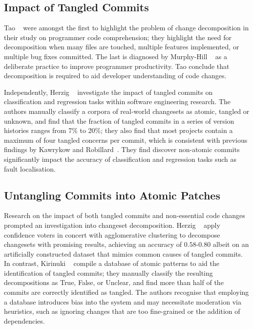 \subsection{Impact of Tangled Commits}
\label{chapter:literature:sec:flexeme_rel_work:impact}

Tao \etal~\cite{Tao2012} were amongst the first to highlight the problem of
change decomposition in their study on programmer code comprehension; they
highlight the need for decomposition when many files are touched, multiple
features implemented, or multiple bug fixes committed. The last is diagnosed
by Murphy-Hill \etal~\cite{Murphy-Hill2012} as a deliberate practice to improve
programmer productivity. Tao \etal conclude that decomposition is required to
aid developer understanding of code changes.

Independently, Herzig \etal~\cite{Herzig2013, Herzig2016} investigate the impact
of tangled commits on classification and regression tasks within software
engineering research. The authors manually classify a corpora of real-world
changesets as atomic, tangled or unknown, and find that the fraction of tangled
commits in a series of version histories ranges from 7\% to 20\%; they also find
that most projects contain a maximum of four tangled concerns per commit, which
is  consistent with previous findings by Kawrykow and
Robillard~\cite{Kawrykow2011}. They find discover non-atomic commits
significantly impact the accuracy of classification and regression tasks such as
fault localisation. 

\subsection{Untangling Commits into Atomic Patches}
\label{chapter:literature:sec:flexeme_rel_work:untangle}
Research on the impact of both tangled commits and non-essential code changes
prompted an investigation into changeset decomposition. Herzig
\etal~\cite{Herzig2013, Herzig2016} apply confidence voters in concert with
agglomerative clustering to decompose changesets with promising results,
achieving an accuracy of $0.58$-$0.80$ albeit on an artificially constructed
dataset that mimics common causes of tangled commits. In contrast, Kirinuki
\etal~\cite{Kirinuki2014, Kirinuki2017} compile a database of atomic patterns to
aid the identification of tangled commits; they manually classify the resulting
decompositions as True, False, or Unclear, and find more than half of the
commits are correctly identified as tangled. The authors recognise that
employing a database introduces bias into the system and may necessitate
moderation via heuristics, such as ignoring changes that are too fine-grained or
the addition of dependencies.

